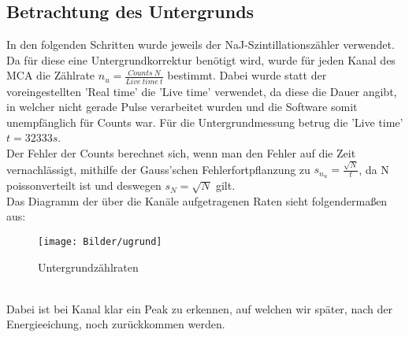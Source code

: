 \subsection{Betrachtung des Untergrunds}
In den folgenden Schritten wurde jeweils der NaJ-Szintillationszähler verwendet. Da für diese eine Untergrundkorrektur benötigt wird, wurde für jeden Kanal des MCA die Zählrate $n_{u}=\frac{Counts~N}{Live~time~t}$ bestimmt. Dabei wurde statt der voreingestellten 'Real time' die 'Live time' verwendet, da diese die Dauer angibt, in welcher nicht gerade Pulse verarbeitet wurden und die Software somit unempfänglich für Counts war. Für die Untergrundmessung betrug die 'Live time' $t=32333 s$.\\
 Der Fehler der Counts berechnet sich, wenn man den Fehler auf die Zeit vernachlässigt, mithilfe der Gauss'schen Fehlerfortpflanzung zu $s_{n_{u}}=\frac{\sqrt{N}}{t}$, da N poissonverteilt ist und deswegen $s_{N}=\sqrt{N}$ gilt. \\
 Das Diagramm der über die Kanäle aufgetragenen Raten sieht folgendermaßen aus:
 \begin{figure}[h]
 \begin{center}
 \texttt{[image: Bilder/ugrund]}
 \caption{Untergrundzählraten}
 \end{center}
 \end{figure}
 ~\\
 Dabei ist bei Kanal klar ein Peak zu erkennen, auf welchen wir später, nach der Energieeichung, noch zurückkommen werden.
